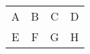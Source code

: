 \documentclass{jsarticle}
\title{}
\author{}
\date{\today}
\begin{document}
\begin{tabular}{ | c | c | c | c | }
 \hline
    A & B & C & D \\
    E & F & G & H \\
 \hline
\end{tabular}
\end{document}
